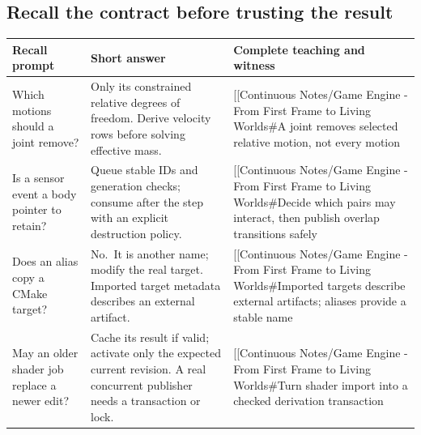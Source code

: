 \subsection{Recall the contract before trusting the result}\label{appendix-64ea716dcadc-recall-the-contract-before-trusting-the-result}

{\def\LTcaptype{none} %
\begin{longtable}[]{@{}
  >{\raggedright\arraybackslash}p{}
  >{\raggedright\arraybackslash}p{}
  >{\raggedright\arraybackslash}p{}@{}}
\toprule\noalign{}
\begin{minipage}[b]{\linewidth}\raggedright
Recall prompt
\end{minipage} & \begin{minipage}[b]{\linewidth}\raggedright
Short answer
\end{minipage} & \begin{minipage}[b]{\linewidth}\raggedright
Complete teaching and witness
\end{minipage} \\
\midrule\noalign{}
\endhead
\bottomrule\noalign{}
\endlastfoot
Which motions should a joint remove? & Only its constrained relative degrees of freedom. Derive velocity rows before solving effective mass. & {[}{[}Continuous Notes/Game Engine - From First Frame to Living Worlds\#A joint removes selected relative motion, not every motion \\
Is a sensor event a body pointer to retain? & Queue stable IDs and generation checks; consume after the step with an explicit destruction policy. & {[}{[}Continuous Notes/Game Engine - From First Frame to Living Worlds\#Decide which pairs may interact, then publish overlap transitions safely \\
Does an alias copy a CMake target? & No.~It is another name; modify the real target. Imported target metadata describes an external artifact. & {[}{[}Continuous Notes/Game Engine - From First Frame to Living Worlds\#Imported targets describe external artifacts; aliases provide a stable name \\
May an older shader job replace a newer edit? & Cache its result if valid; activate only the expected current revision. A real concurrent publisher needs a transaction or lock. & {[}{[}Continuous Notes/Game Engine - From First Frame to Living Worlds\#Turn shader import into a checked derivation transaction \\
\end{longtable}
}
